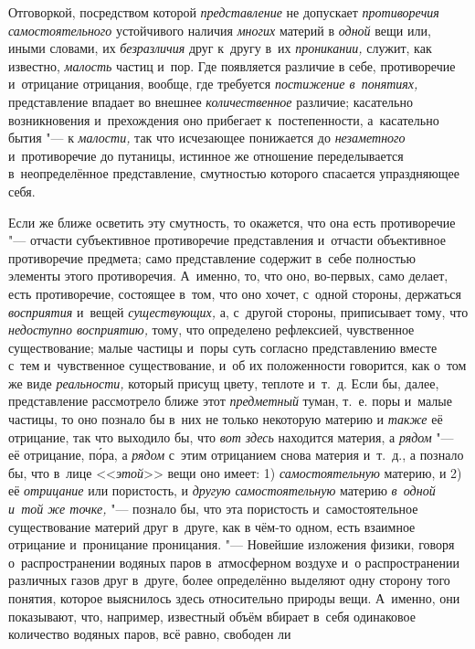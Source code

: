 Отговоркой, посредством которой {\em представление} не
допускает {\em противоречия самостоятельного}
устойчивого наличия {\em многих} материй в
{\em одной} вещи или, иными словами, их
{\em безразличия} друг к~другу в~их
{\em проникании,} служит, как известно,
{\em малость} частиц и~пор. Где появляется различие в
себе, противоречие и~отрицание отрицания, вообще, где требуется
{\em постижение в~понятиях,} представление впадает во
внешнее {\em количественное} различие; касательно
возникновения и~прехождения оно прибегает к~постепенности, а~касательно
бытия "--- к {\em малости,} так что исчезающее понижается
до {\em незаметного} и~противоречие до путаницы,
истинное же отношение переделывается в~неопределённое представление,
смутностью которого спасается упраздняющее себя.

Если же ближе осветить эту смутность, то окажется, что она есть противоречие
"--- отчасти субъективное противоречие представления и~отчасти объективное
противоречие предмета; само представление содержит в~себе полностью
элементы этого противоречия. А~именно, то, что оно, во-первых, само делает,
есть противоречие, состоящее в~том, что оно хочет, с~одной стороны,
держаться {\em восприятия} и~вещей
{\em существующих,} а, с~другой стороны, приписывает
тому, что {\em недоступно восприятию,} тому, что
определено рефлексией, чувственное существование; малые частицы и~поры суть
согласно представлению вместе с~тем и~чувственное существование, и~об их
положенности говорится, как о~том же виде
{\em реальности,} который присущ цвету, теплоте и~т.~д.
Если бы, далее, представление рассмотрело ближе этот
{\em предметный} туман, т.~е. поры и~малые частицы, то
оно познало бы в~них не только некоторую материю и
{\em также} её отрицание, так что выходило бы, что
{\em вот здесь} находится материя, а
{\em рядом} "--- её отрицание, п\'{о}ра, а
{\em рядом} с~этим отрицанием снова материя и~т.~д., а
познало бы, что в~лице <<{\em этой}>> вещи оно имеет: 1)
{\em самостоятельную} материю, и 2) её {\em отрицание} или пористость, и
{\em другую самостоятельную} материю
{\em в~одной и~той же точке,} "--- познало бы, что эта
пористость и~самостоятельное существование материй друг в~друге, как в
чём-то одном, есть взаимное отрицание и~проницание проницания. "--- Новейшие
изложения физики, говоря о~распространении водяных паров в~атмосферном
воздухе и~о распространении различных газов друг в~друге, более определённо
выделяют одну сторону того понятия, которое выяснилось здесь относительно
природы вещи. А~именно, они показывают, что, например, известный объём
вбирает в~себя одинаковое количество водяных паров, всё равно, свободен ли
